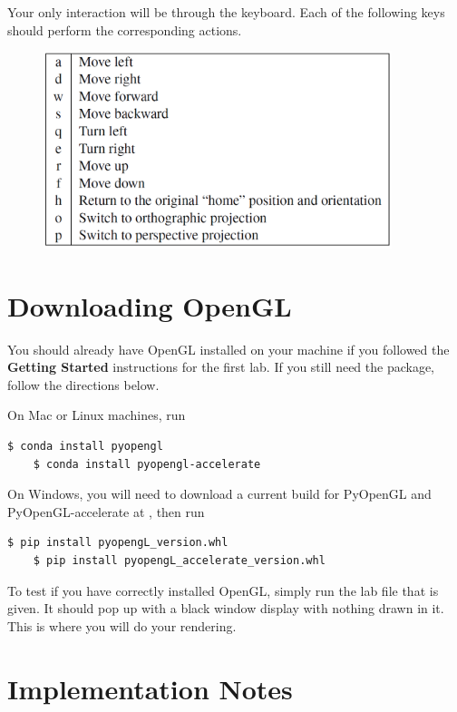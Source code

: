 \documentclass[11pt]{article}
\begin{document}
Your only interaction will be through the keyboard. Each of the following keys should perform the corresponding actions.

\begin{figure}[!hbt]
	\begin{center}
		\includegraphics[width=4in]{keys.png}
	\end{center}
	\label{fig:screenshot}
\end{figure}


\section*{Downloading OpenGL}

You should already have OpenGL installed on your machine if you followed the \textbf{Getting Started} instructions for the first lab. If you still need the package, follow the directions below.

On Mac or Linux machines, run

\begin{lstlisting}[language=bash]
    $ conda install pyopengl
    $ conda install pyopengl-accelerate
\end{lstlisting}

On Windows, you will need to download a current build for PyOpenGL and PyOpenGL-accelerate at , then run
\begin{lstlisting}[language=bash]
    $ pip install pyopengL_version.whl
    $ pip install pyopengL_accelerate_version.whl
\end{lstlisting}

To test if you have correctly installed OpenGL, simply run the lab file that is given. It should pop up with a black window display with nothing drawn in it. This is where you will do your rendering.

\section*{Implementation Notes}
\end{document}
